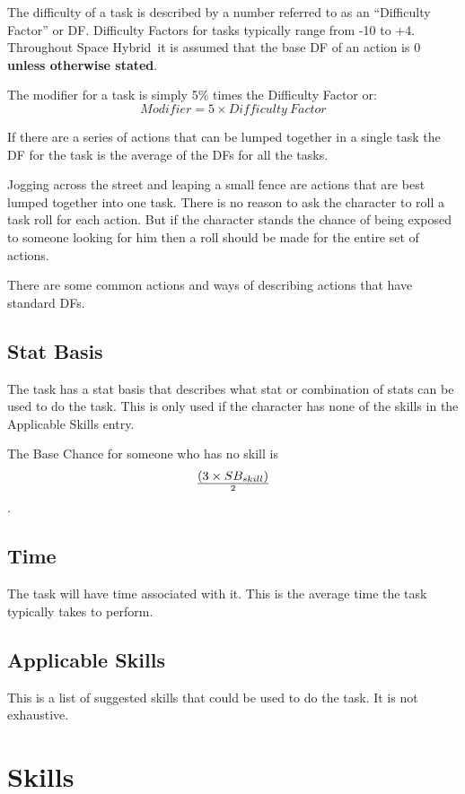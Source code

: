 The difficulty of a task is described by a number 
referred to as an ``Difficulty Factor'' or DF. Difficulty Factors 
for tasks typically range from -10  to +4. Throughout Space Hybrid\ it is 
assumed that the base DF of an action is 0 {\bf unless otherwise 
stated}. 

The modifier for a task is simply 5\% times the Difficulty Factor or:
\[ Modifier = 5 \times {Difficulty\ Factor} \]

If there are a series of actions that can be lumped 
together in a single task the DF for the task is the average of the DFs for all the tasks.

Jogging across the street and leaping a small fence are actions that 
are best lumped together into one task. There is no reason 
to ask the character to roll a task roll for each action. 
But if the character stands the chance of being exposed to
someone looking for him then a roll should be made for the entire set 
of actions. 

There are some common actions and ways of describing actions that have
standard DFs.




\subsection{Stat Basis}

The task has a {stat basis} that describes what stat or combination of 
stats can be used to do the task. This is only used if the character 
has none of the skills in the Applicable Skills entry. 

The Base Chance for someone who has no skill is 
\[ (3 \times SB_{skill}) \over {2} \]. 

\subsection{Time}

The task will have time associated with it. This is the average time 
the task typically takes to perform. 

\subsection{Applicable Skills}

This is a list of suggested skills that could be used to do the task. 
It is not exhaustive.

\section{Skills}

